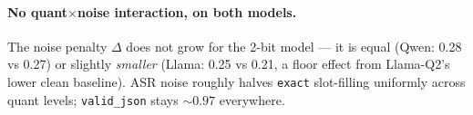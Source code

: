 \documentclass[11pt]{article}
\newcommand{\code}[1]{\texttt{#1}}
\begin{document}
\begin{table}[t]
\centering
\begin{minipage}[t]{0.48\linewidth}\centering
{}
\caption{Qwen2.5-3B-Instruct.}
\label{tab:qwen}
\end{minipage}\hfill
\begin{minipage}[t]{0.48\linewidth}\centering
{}
\caption{Llama-3.2-3B-Instruct.}
\label{tab:llama}
\end{minipage}
\end{table}

\paragraph{No quant$\times$noise interaction, on both models.} The noise penalty
$\Delta$ does not grow for the 2-bit model --- it is equal (Qwen: 0.28 vs 0.27) or
slightly \emph{smaller} (Llama: 0.25 vs 0.21, a floor effect from Llama-Q2's lower
clean baseline). ASR noise roughly halves \code{exact} slot-filling uniformly across
quant levels; \code{valid\_json} stays ${\sim}0.97$ everywhere.
\end{document}
